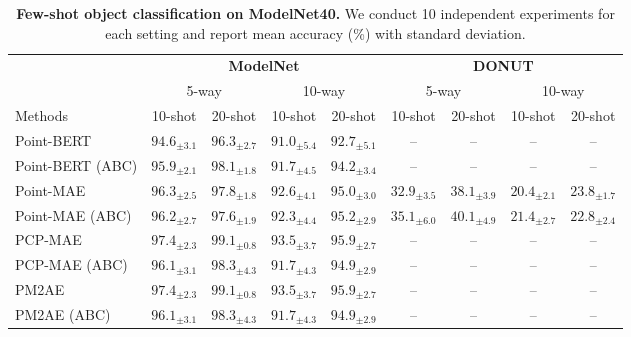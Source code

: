 \begin{table}
\begin{center}
\begin{tabular}{l|cccc|cccc}
    
\toprule
& \multicolumn{4}{c|}{\textbf{ModelNet}} & \multicolumn{4}{c}{\textbf{DONUT}} \\
& \multicolumn{2}{c}{5-way} & \multicolumn{2}{c|}{10-way} & \multicolumn{2}{c}{5-way} & \multicolumn{2}{c}{10-way} \\
\cmidrule(lr){2-3} \cmidrule(lr){4-5} \cmidrule(lr){6-7} \cmidrule(lr){8-9}
Methods & 10-shot & 20-shot & 10-shot & 20-shot & 10-shot & 20-shot & 10-shot & 20-shot \\
\midrule

Point-BERT~\cite{pbert} & $94.6_{\pm 3.1}$ & $96.3_{\pm 2.7}$ & $91.0_{\pm 5.4}$ & $92.7_{\pm 5.1}$ & -- & -- & -- & --\\
Point-BERT (ABC) & \cellcolor{green!25}$95.9_{\pm 2.1}$ & \cellcolor{green!25}$98.1_{\pm 1.8}$ & \cellcolor{green!25}$91.7_{\pm 4.5}$ & \cellcolor{green!25}$94.2_{\pm 3.4}$ & -- & -- & -- & --\\
\midrule
Point-MAE~\cite{pmae} & $96.3_{\pm 2.5}$ & $97.8_{\pm 1.8}$ & $92.6_{\pm 4.1}$ & $95.0_{\pm 3.0}$ & $32.9_{\pm 3.5}$ & $38.1_{\pm 3.9}$ & $20.4_{\pm 2.1}$ & $23.8_{\pm 1.7}$ \\
Point-MAE (ABC) & \cellcolor{orange!25}$96.2_{\pm 2.7}$ & \cellcolor{orange!25}$97.6_{\pm 1.9}$ & \cellcolor{orange!25}$92.3_{\pm 4.4}$ & \cellcolor{green!25}$95.2_{\pm 2.9}$ & \cellcolor{green!25}$35.1_{\pm 6.0}$ & \cellcolor{green!25}$40.1_{\pm 4.9}$ & \cellcolor{green!25}$21.4_{\pm 2.7}$ & \cellcolor{green!25}$22.8_{\pm 2.4}$\\
\midrule
PCP-MAE~\cite{pcpmae} & $97.4_{\pm 2.3}$ & $99.1_{\pm 0.8}$ & $93.5_{\pm 3.7}$ & $95.9_{\pm 2.7}$ & -- & -- & -- & --\\
PCP-MAE (ABC) & \cellcolor{orange!25}$96.1_{\pm 3.1}$ & \cellcolor{orange!25}$98.3_{\pm 4.3}$ & \cellcolor{orange!25}$91.7_{\pm 4.3}$ & \cellcolor{orange!25}$94.9_{\pm 2.9}$ & -- & -- & -- & --\\
\midrule
PM2AE~\cite{pm2ae} & $97.4_{\pm 2.3}$ & $99.1_{\pm 0.8}$ & $93.5_{\pm 3.7}$ & $95.9_{\pm 2.7}$ & -- & -- & -- & --\\
PM2AE (ABC) & \cellcolor{orange!25}$96.1_{\pm 3.1}$ & \cellcolor{orange!25}$98.3_{\pm 4.3}$ & \cellcolor{orange!25}$91.7_{\pm 4.3}$ & \cellcolor{orange!25}$94.9_{\pm 2.9}$ & -- & -- & -- & --\\

\bottomrule
\end{tabular}
\caption{{\bf Few-shot object classification on ModelNet40.} We conduct 10 independent experiments for each setting and report mean accuracy (\%) with standard deviation.}
\setlength\tabcolsep{2pt}
\label{tb:few}
\end{center}

\end{table}